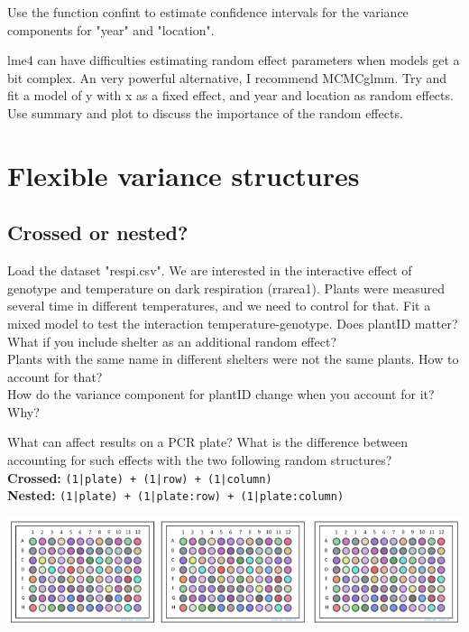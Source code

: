 \documentclass[12pt,a4paper]{scrartcl}\usepackage[]{graphicx}\usepackage[]{color}
\begin{document}
\begin{Exercise}[difficulty=1, title={CI for variance components in lme4}]
Use the function confint to estimate confidence intervals for the variance components for "year" and "location".
\end{Exercise}



\begin{Exercise}[difficulty=2, title={Testing variance components in MCMCglmm}]
lme4 can have difficulties estimating random effect parameters when models get a bit complex. An very powerful alternative, I recommend MCMCglmm. Try and fit a model of y with x as a fixed effect, and year and location as random effects. Use summary and plot to discuss the importance of the random effects.
\end{Exercise}


\section{Flexible variance structures}

\subsection{Crossed or nested?}



\begin{Exercise}[difficulty=2, title={Plants and shelters}]
Load the dataset "respi.csv". We are interested in the interactive effect of genotype and temperature on dark respiration (rrarea1). Plants were measured several time in different temperatures, and we need to control for that.
Fit a mixed model to test the interaction temperature-genotype. Does plantID matter? What if you include shelter as an additional random effect?\\
Plants with the same name in different shelters were not the same plants. How to account for that?\\
How do the variance component for plantID change when you account for it? Why?
\end{Exercise}


\begin{Exercise}[difficulty=1, title={PCR plate}]
What can affect results on a PCR plate? What is the difference between accounting for such effects with the two following random structures?\\
\textbf{Crossed:} \texttt{(1|plate) + (1|row) + (1|column)}\\
\textbf{Nested:} \texttt{(1|plate) + (1|plate:row) + (1|plate:column)}

\includegraphics[width=\textwidth]{Figures/nestedplates}
\end{Exercise}
\end{document}
